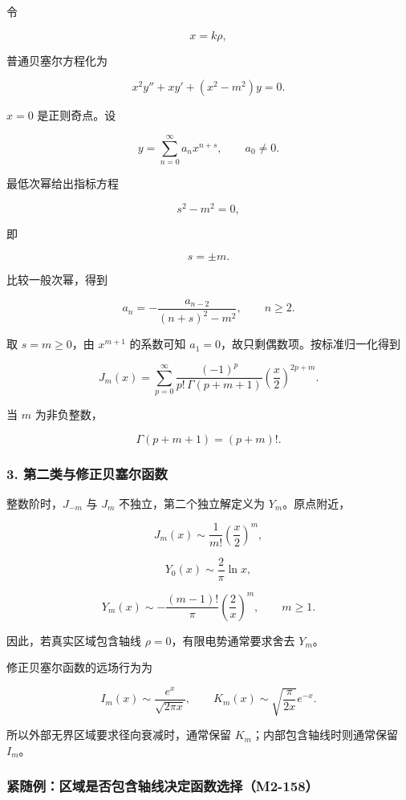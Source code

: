 令

\[
x=k\rho,
\]

普通贝塞尔方程化为

\[
x^2y''+xy'+(x^2-m^2)y=0.
\]

\(x=0\) 是正则奇点。设

\[
y=\sum_{n=0}^{\infty}a_nx^{n+s},
\qquad a_0\ne0.
\]

最低次幂给出指标方程

\[
\boxed{s^2-m^2=0},
\]

即

\[
s=\pm m.
\]

比较一般次幂，得到

\[
\boxed{
a_n
=-\frac{a_{n-2}}{(n+s)^2-m^2}
},
\qquad n\ge2.
\]

取 \(s=m\ge0\)，由 \(x^{m+1}\) 的系数可知
\(a_1=0\)，故只剩偶数项。按标准归一化得到

\[
\boxed{
J_m(x)
=\sum_{p=0}^{\infty}
\frac{(-1)^p}{p!\,\Gamma(p+m+1)}
\left(\frac x2\right)^{2p+m}
}.
\]

当 \(m\) 为非负整数，

\[
\Gamma(p+m+1)=(p+m)!.
\]

\subsubsection{3.
第二类与修正贝塞尔函数}\label{m2:ux7b2cux4e8cux7c7bux4e0eux4feeux6b63ux8d1dux585eux5c14ux51fdux6570}

整数阶时，\(J_{-m}\) 与 \(J_m\) 不独立，第二个独立解定义为
\(Y_m\)。原点附近，

\[
J_m(x)\sim\frac1{m!}\left(\frac x2\right)^m,
\]

\[
Y_0(x)\sim\frac2\pi\ln x,
\]

\[
Y_m(x)\sim-\frac{(m-1)!}{\pi}
\left(\frac2x\right)^m,
\qquad m\ge1.
\]

因此，若真实区域包含轴线 \(\rho=0\)，有限电势通常要求舍去 \(Y_m\)。

修正贝塞尔函数的远场行为为

\[
I_m(x)\sim\frac{e^x}{\sqrt{2\pi x}},
\qquad
K_m(x)\sim\sqrt{\frac{\pi}{2x}}e^{-x}.
\]

所以外部无界区域要求径向衰减时，通常保留
\(K_m\)；内部包含轴线时则通常保留 \(I_m\)。

\subsubsection{紧随例：区域是否包含轴线决定函数选择（M2-158）}\label{m2:ux7d27ux968fux4f8bux533aux57dfux662fux5426ux5305ux542bux8f74ux7ebfux51b3ux5b9aux51fdux6570ux9009ux62e9m2-158}

